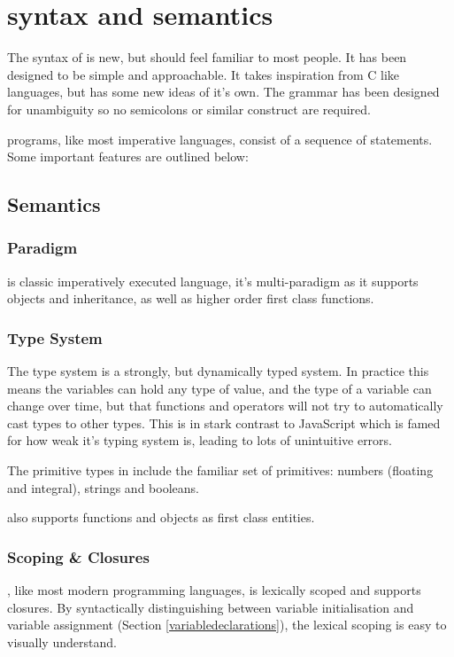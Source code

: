 \chapter{\Setanta{} syntax and semantics}
\label{setantadocs}
The syntax of \Setanta{} is new, but should feel familiar to most people. It has been designed to be simple and approachable. It takes inspiration from C like languages, but has some new ideas of it's own.
The grammar has been designed for unambiguity so no semicolons or similar construct are required.

\Setanta{} programs, like most imperative languages, consist of a sequence of statements. Some important \Setanta{} features are outlined below:

\section{Semantics}

\subsection{Paradigm}

\Setanta{} is classic imperatively executed language, it's multi-paradigm as it supports objects and inheritance, as well as higher order first class functions.

\subsection{Type System}
The \Setanta{} type system is a strongly, but dynamically typed system. In practice this means the variables can hold any type of value, and the type of a variable can change over time, but that functions and operators will not try to automatically cast types to other types. This is in stark contrast to JavaScript which is famed for how weak it's typing system is, leading to lots of unintuitive errors.

The primitive types in \Setanta{} include the familiar set of primitives: numbers (floating and integral), strings and booleans.

\Setanta{} also supports functions and objects as first class entities.

\subsection{Scoping \& Closures}

\Setanta{}, like most modern programming languages, is lexically scoped and supports closures. By syntactically distinguishing between variable initialisation and variable assignment (Section \ref{variabledeclarations}), the lexical scoping is easy to visually understand.

